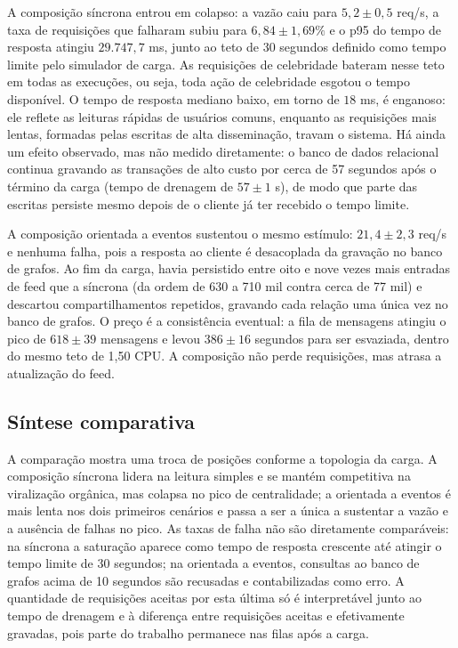 A composição síncrona entrou em colapso: a vazão caiu para $5{,}2 \pm 0{,}5$ req/s, a taxa de requisições que falharam subiu para $6{,}84 \pm 1{,}69\%$ e o p95 do tempo de resposta atingiu $29.747{,}7$ ms, junto ao teto de 30 segundos definido como tempo limite pelo simulador de carga. As requisições de celebridade bateram nesse teto em todas as execuções, ou seja, toda ação de celebridade esgotou o tempo disponível. O tempo de resposta mediano baixo, em torno de $18$ ms, é enganoso: ele reflete as leituras rápidas de usuários comuns, enquanto as requisições mais lentas, formadas pelas escritas de alta disseminação, travam o sistema. Há ainda um efeito observado, mas não medido diretamente: o banco de dados relacional continua gravando as transações de alto custo por cerca de 57 segundos após o término da carga (tempo de drenagem de $57 \pm 1$ s), de modo que parte das escritas persiste mesmo depois de o cliente já ter recebido o tempo limite.

A composição orientada a eventos sustentou o mesmo estímulo: $21{,}4 \pm 2{,}3$ req/s e nenhuma falha, pois a resposta ao cliente é desacoplada da gravação no banco de grafos. Ao fim da carga, havia persistido entre oito e nove vezes mais entradas de feed que a síncrona (da ordem de 630 a 710 mil contra cerca de 77 mil) e descartou compartilhamentos repetidos, gravando cada relação uma única vez no banco de grafos. O preço é a consistência eventual: a fila de mensagens atingiu o pico de $618 \pm 39$ mensagens e levou $386 \pm 16$ segundos para ser esvaziada, dentro do mesmo teto de 1,50 CPU. A composição não perde requisições, mas atrasa a atualização do feed.

\estrutura\subsection{\esp Síntese comparativa}

A comparação mostra uma troca de posições conforme a topologia da carga. A composição síncrona lidera na leitura simples e se mantém competitiva na viralização orgânica, mas colapsa no pico de centralidade; a orientada a eventos é mais lenta nos dois primeiros cenários e passa a ser a única a sustentar a vazão e a ausência de falhas no pico. As taxas de falha não são diretamente comparáveis: na síncrona a saturação aparece como tempo de resposta crescente até atingir o tempo limite de 30 segundos; na orientada a eventos, consultas ao banco de grafos acima de 10 segundos são recusadas e contabilizadas como erro. A quantidade de requisições aceitas por esta última só é interpretável junto ao tempo de drenagem e à diferença entre requisições aceitas e efetivamente gravadas, pois parte do trabalho permanece nas filas após a carga.

